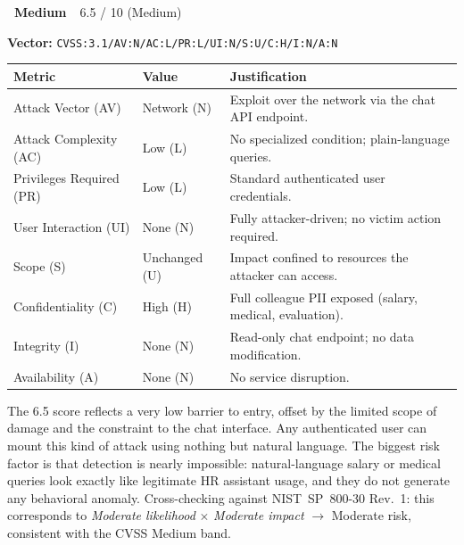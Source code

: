 \documentclass[11pt,a4paper]{report}
\newcommand{\badgemedium}{\colorbox{safe}{\color{white}\small\textbf{~Medium~}}}
\newcommand{\cvssvec}[1]{\texttt{\small #1}}
\begin{document}
\begin{cvssbox}{\badgemedium\ 6.5 / 10 (Medium)}
\vspace{2pt}
\begin{center}
\textbf{Vector:}\enspace
\cvssvec{CVSS:3.1/AV:N/AC:L/PR:L/UI:N/S:U/C:H/I:N/A:N}
\end{center}
\vspace{8pt}
\begin{tabular}{W{3.4cm}W{2.2cm}W{7.8cm}}
\toprule
  
  \small\textbf{Metric} &
  \small\textbf{Value} &
  \small\textbf{Justification} \\
  \midrule
  
  \small Attack Vector (AV)     & \small Network (N) & \small Exploit over the network via the chat API endpoint. \\
  
  \small Attack Complexity (AC) & \small Low (L)     & \small No specialized condition; plain-language queries. \\
  
  \small Privileges Required (PR)  & \small Low (L) & \small Standard authenticated user credentials. \\
  
  \small User Interaction (UI)  & \small None (N)    & \small Fully attacker-driven; no victim action required. \\
  
  \small Scope (S)              & \small Unchanged (U) & \small Impact confined to resources the attacker can access. \\
  
  \small Confidentiality (C)    & \small High (H)    & \small Full colleague PII exposed (salary, medical, evaluation). \\
  
  \small Integrity (I)          & \small None (N)    & \small Read-only chat endpoint; no data modification. \\
  
  \small Availability (A)       & \small None (N)    & \small No service disruption. \\
  \bottomrule
\end{tabular}
\vspace{6pt}

\small The 6.5 score reflects a very low barrier to entry, offset by the
limited scope of damage and the constraint to the chat interface. Any
authenticated user can mount this kind of attack using nothing but natural
language. The biggest risk factor is that detection is nearly
impossible: natural-language salary or medical queries look exactly like
legitimate HR assistant usage, and they do not generate any behavioral
anomaly. Cross-checking against NIST~SP~800-30 Rev.~1: this corresponds
to \emph{Moderate likelihood} $\times$ \emph{Moderate impact}
$\to$ Moderate risk, consistent with the CVSS Medium band.
\end{cvssbox}
\end{document}
